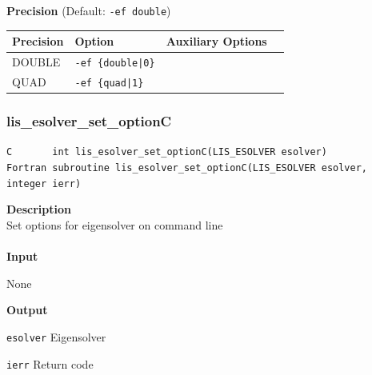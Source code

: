 \documentclass[a4paper]{article}
\newcommand{\namelistlabel}[1]{\mbox{#1}\hfill}
\newenvironment{namelist}[1]{%
 \begin{list}{}
  {\let\makelabel\namelistlabel
  \settowidth{\labelwidth}{#1}
  \setlength{\leftmargin}{1.1\labelwidth}}
}{%
\end{list}}
\begin{document}
\\ \\
\begin{minipage}[t]{\textwidth}
\begin{center}
{\bf Precision} (Default: \verb=-ef double=)\\
\begin{tabular}{l|lll}\hline\hline
Precision     & Option           & Auxiliary Options \\ \hline
DOUBLE   & \verb=-ef {double|0}=    &   \\
QUAD     & \verb=-ef {quad|1}=      &   \\
\hline         
\end{tabular}
\end{center}
\end{minipage}
\newpage
  \subsubsection{lis\_esolver\_set\_optionC}
\begin{screen}
\verb|C       int lis_esolver_set_optionC(LIS_ESOLVER esolver)|\\
\verb|Fortran subroutine lis_esolver_set_optionC(LIS_ESOLVER esolver, integer ierr)|
\end{screen}
{\bf Description}\\
\indent
Set options for eigensolver on command line
\\ \\
\noindent
{\bf Input}
\begin{namelist}{XXXXXXXXXXXXXXXXXXXX}
\item[None]
\end{namelist}
{\bf Output}
\begin{namelist}{XXXXXXXXXXXXXXXXXXXX}
\item[\tt esolver] Eigensolver
\item[\tt ierr] Return code
\end{namelist}
\end{document}
